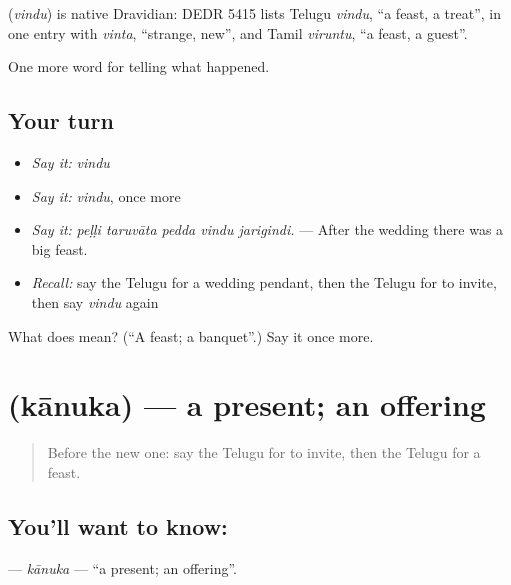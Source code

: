 \begin{cousinweb}
\textbf{} (\emph{vindu}) is native Dravidian: DEDR 5415 lists Telugu \emph{vindu}, \textquotedblleft{}a feast, a treat\textquotedblright{}, in one entry with \emph{vinta}, \textquotedblleft{}strange, new\textquotedblright{}, and Tamil \emph{viruntu}, \textquotedblleft{}a feast, a guest\textquotedblright{}.
\end{cousinweb}

\begin{grammarlens}[title={What you've built}]
One more word for telling what happened.
\end{grammarlens}

\subsection*{Your turn}
\begin{itemize}
\raggedright
  \item \emph{Say it:} \emph{vindu}
  \item \emph{Say it:} \emph{vindu}, once more
  \item \emph{Say it:} \emph{peḷḷi taruvāta pedda vindu jarigindi.} — After the wedding there was a big feast.
  \item \emph{Recall:} say the Telugu for a wedding pendant, then the Telugu for to invite, then say \emph{vindu} again
\end{itemize}

\begin{tcolorbox}[breakable,colback=teal!4,colframe=teal!35!black,title={Before you move on}]
What does  mean? (\textquotedblleft{}A feast; a banquet\textquotedblright{}.) Say it once more.
\end{tcolorbox}
\section[\texorpdfstring{\te{కానుక} (kānuka)}{కానుక (kānuka)}]{ (kānuka) — a present; an offering}

\label{lesson:TE-C347-kanuka}



\begin{quote}
Before the new one: say the Telugu for to invite, then the Telugu for a feast.
\end{quote}

\subsection*{You'll want to know: }
\textbf{} — \emph{kānuka} — \textquotedblleft{}a present; an offering\textquotedblright{}.

